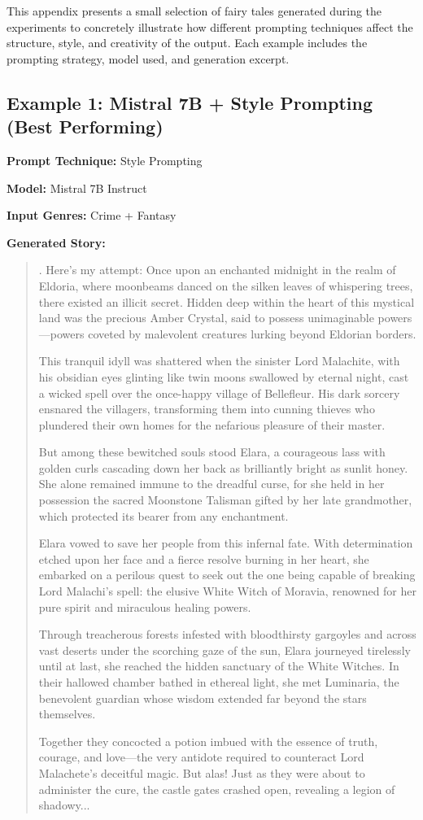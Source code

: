 \documentclass[12pt]{article}
\begin{document}
This appendix presents a small selection of fairy tales generated during the experiments to concretely illustrate how different prompting techniques affect the structure, style, and creativity of the output. Each example includes the prompting strategy, model used, and generation excerpt.

\subsection*{Example 1: Mistral 7B + Style Prompting (Best Performing)}
\textbf{Prompt Technique:} Style Prompting

\textbf{Model:} Mistral 7B Instruct

\textbf{Input Genres:} Crime + Fantasy

\vspace{0.5em}
\noindent
\textbf{Generated Story:}
\begin{quote}
. Here's my attempt: Once upon an enchanted midnight in the realm of Eldoria, where moonbeams danced on the silken leaves of whispering trees, there existed an illicit secret. Hidden deep within the heart of this mystical land was the precious Amber Crystal, said to possess unimaginable powers—powers coveted by malevolent creatures lurking beyond Eldorian borders.

This tranquil idyll was shattered when the sinister Lord Malachite, with his obsidian eyes glinting like twin moons swallowed by eternal night, cast a wicked spell over the once-happy village of Bellefleur. His dark sorcery ensnared the villagers, transforming them into cunning thieves who plundered their own homes for the nefarious pleasure of their master.

But among these bewitched souls stood Elara, a courageous lass with golden curls cascading down her back as brilliantly bright as sunlit honey. She alone remained immune to the dreadful curse, for she held in her possession the sacred Moonstone Talisman gifted by her late grandmother, which protected its bearer from any enchantment.

Elara vowed to save her people from this infernal fate. With determination etched upon her face and a fierce resolve burning in her heart, she embarked on a perilous quest to seek out the one being capable of breaking Lord Malachi's spell: the elusive White Witch of Moravia, renowned for her pure spirit and miraculous healing powers.

Through treacherous forests infested with bloodthirsty gargoyles and across vast deserts under the scorching gaze of the sun, Elara journeyed tirelessly until at last, she reached the hidden sanctuary of the White Witches. In their hallowed chamber bathed in ethereal light, she met Luminaria, the benevolent guardian whose wisdom extended far beyond the stars themselves.

Together they concocted a potion imbued with the essence of truth, courage, and love—the very antidote required to counteract Lord Malachete's deceitful magic. But alas! Just as they were about to administer the cure, the castle gates crashed open, revealing a legion of shadowy...
\end{quote}
\end{document}

